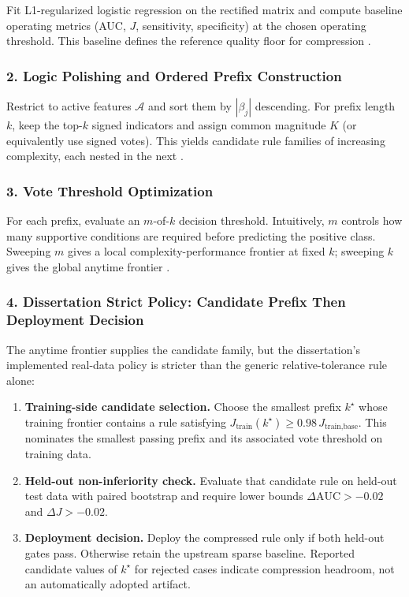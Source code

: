 Fit L1-regularized logistic regression on the rectified matrix and compute baseline operating metrics (AUC, $J$, sensitivity, specificity) at the chosen operating threshold. This baseline defines the reference quality floor for compression \autocite{tibshirani1996,fried2010,tay2023,JOrender2025Anytime}.

\subsubsection{2. Logic Polishing and Ordered Prefix Construction}

Restrict to active features $\mathcal{A}$ and sort them by $|\beta_j|$ descending. For prefix length $k$, keep the top-$k$ signed indicators and assign common magnitude $K$ (or equivalently use signed votes). This yields candidate rule families of increasing complexity, each nested in the next \autocite{JOrender2025Anytime}.

\subsubsection{3. Vote Threshold Optimization}

For each prefix, evaluate an $m$-of-$k$ decision threshold. Intuitively, $m$ controls how many supportive conditions are required before predicting the positive class. Sweeping $m$ gives a local complexity-performance frontier at fixed $k$; sweeping $k$ gives the global anytime frontier \autocite{JOrender2025Anytime}.

\subsubsection{4. Dissertation Strict Policy: Candidate Prefix Then Deployment Decision}

The anytime frontier supplies the candidate family, but the dissertation's implemented real-data policy is stricter than the generic relative-tolerance rule alone:
\begin{enumerate}
	\item \textbf{Training-side candidate selection.} Choose the smallest prefix $k^\star$ whose training frontier contains a rule satisfying $J_{\text{train}}(k^\star)\geq 0.98\,J_{\text{train,base}}$. This nominates the smallest passing prefix and its associated vote threshold on training data.
	\item \textbf{Held-out non-inferiority check.} Evaluate that candidate rule on held-out test data with paired bootstrap and require lower bounds $\Delta \mathrm{AUC}>-0.02$ and $\Delta J>-0.02$.
	\item \textbf{Deployment decision.} Deploy the compressed rule only if both held-out gates pass. Otherwise retain the upstream sparse baseline. Reported candidate values of $k^\star$ for rejected cases indicate compression headroom, not an automatically adopted artifact.
\end{enumerate}

